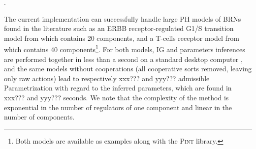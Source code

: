 .

The current implementation can successfully handle large PH models of BRNs found in the literature
such as an ERBB receptor-regulated G1/S transition model from \cite{Sahin09} which contains 20
components, and a T-cells receptor model from \cite{Klamt06} which contains 40
components\footnote{Both models are available as examples along with the \textsc{Pint} library.}.
For both models, IG and parameters inferences are performed together in less than a second on a
standard desktop computer%
, and the same models without cooperations
(all cooperative sorts removed, leaving only raw actions) lead to
respectively xxx??? and yyy??? admissible Parametrization with regard to the inferred parameters,
which are found in xxx??? and yyy??? seconds.
We note that the complexity of the method is exponential in the number of regulators of one
component and linear in the number of components.

